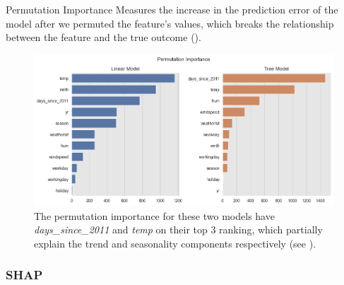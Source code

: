 \documentclass[10pt]{beamer}
\begin{document}
\begin{frame}{Permutation Importance}
Measures the increase in the prediction error of the model after we permuted the feature's values, which breaks the relationship between the feature and the true outcome (\cite[Section 5.6]{molnar2019}).
\begin{center}
  \begin{figure}
    \includegraphics[scale=0.35]{images/interpretable_ml_104_0.png}
    \caption{The permutation importance for these two models have {\em days\_since\_2011} and {\em temp} on their top 3 ranking, which partially explain the trend and seasonality components respectively (see \cite[Figure 5.30]{molnar2019}).}
  \end{figure}
\end{center}
\end{frame}

\subsubsection{SHAP}
\end{document}
